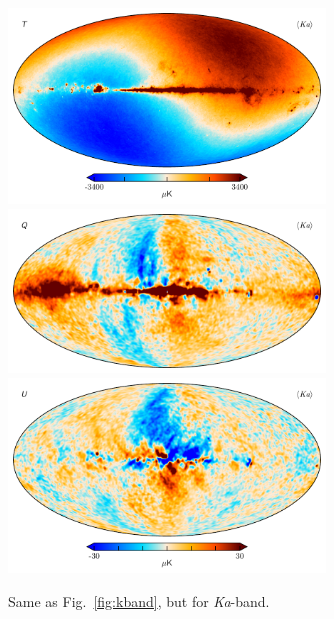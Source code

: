 \documentclass[twocolumn]{../../common/aa}
\newcommand{\Ka}[0]{\textit{Ka}}
\begin{document}
\begin{figure}
	\centering
	\includegraphics[width=0.75\textwidth]{figures/030-WMAP_Ka_mu_I.pdf}
	\includegraphics[width=0.75\textwidth]{figures/030-WMAP_Ka_mu_Q.pdf}
	\includegraphics[width=0.75\textwidth]{figures/030-WMAP_Ka_mu_U.pdf}
	\caption{Same as Fig.~\ref{fig:kband}, but for \Ka-band.}
	\label{fig:kaband}
\end{figure}
\end{document}
